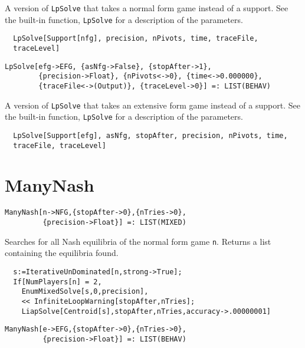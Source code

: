 \noindent
A version of \verb+LpSolve+ that takes a normal form
game instead of a support.  See the built-in function,
\verb+LpSolve+ for a description of the parameters.

\udfbody
\begin{verbatim}
  LpSolve[Support[nfg], precision, nPivots, time, traceFile, 
  traceLevel]
\end{verbatim} 

\newsignature

\begin{verbatim}
LpSolve[efg->EFG, {asNfg->False}, {stopAfter->1},
        {precision->Float}, {nPivots<->0}, {time<->0.000000}, 
        {traceFile<->(Output)}, {traceLevel->0}] =: LIST(BEHAV) 
\end{verbatim}

\noindent
A version of \verb+LpSolve+ that takes an extensive form
game instead of a support.  See the built-in function,
\verb+LpSolve+ for a description of the parameters.

\udfbody
\begin{verbatim}
  LpSolve[Support[efg], asNfg, stopAfter, precision, nPivots, time, 
  traceFile, traceLevel]
\end{verbatim} 


\section*{ManyNash}\label{ExtManyNash}
\begin{verbatim}
ManyNash[n->NFG,{stopAfter->0},{nTries->0},
         {precision->Float}] =: LIST(MIXED)
\end{verbatim}

\noindent
Searches for all Nash equilibria of the normal form game
\verb+n+.  Returns a list containing the equilibria found.

\udfbody
\begin{verbatim}
  s:=IterativeUnDominated[n,strong->True];
  If[NumPlayers[n] = 2, 
    EnumMixedSolve[s,0,precision],
    << InfiniteLoopWarning[stopAfter,nTries];
    LiapSolve[Centroid[s],stopAfter,nTries,accuracy->.00000001]
\end{verbatim} 

\newsignature

\begin{verbatim}
ManyNash[e->EFG,{stopAfter->0},{nTries->0},
         {precision->Float}] =: LIST(BEHAV)
\end{verbatim}


